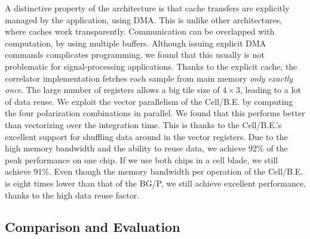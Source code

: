 \documentclass{article}
\begin{document}
A distinctive property of the architecture is that cache transfers are
explicitly managed by the application, using DMA. This is unlike other 
architectures, where caches work transparently.
Communication can be overlapped with computation, by using multiple buffers.
Although issuing explicit DMA commands complicates programming,
we found that this usually is not problematic for signal-processing applications.
Thanks to the explicit cache,
the correlator implementation fetches each sample from main memory
\emph{only exactly once}. 
The large number of registers allows a big tile size of 
$4\times3$, leading to a lot of data reuse.
We exploit the vector parallelism of the \mbox{Cell/B.E.} by computing the four
polarization combinations in parallel.  We found that this performs
better than vectorizing over the integration time.  This is thanks to the \mbox{Cell/B.E.}'s
excellent support for shuffling data around in the vector registers.
Due to the high
memory bandwidth and the ability to reuse data, we achieve 92\% of the peak
performance on one chip.  If we use both chips in a cell blade, we still achieve
91\%.  Even though the memory
bandwidth per operation of the \mbox{Cell/B.E.} is eight times lower than
that of the BG/P, we still achieve excellent performance, thanks to
the high data reuse factor.


\subsection{Comparison and Evaluation}
\label{sec:perf-compare}
\end{document}
